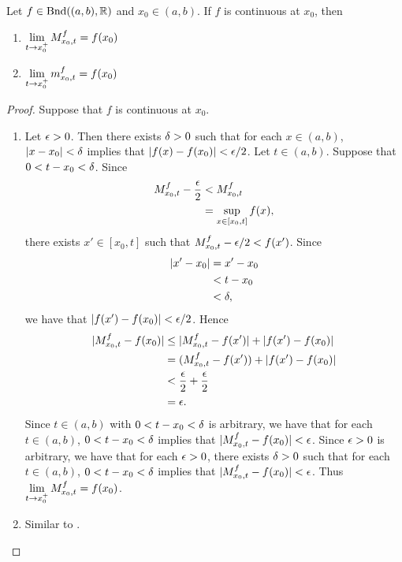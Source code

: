 \documentclass{book}
\begin{document}
	\begin{ex} 
		Let $f \in \text{Bnd}((a,b), \mathbb{R})$ and $x_0 \in (a,b)$. If $f$ is continuous at $x_0$, then 
		\begin{enumerate}
			\item $\lim \limits_{t \rightarrow x_0^+} M^f_{x_0, t} = f(x_0)$ 
			\item $\lim \limits_{t \rightarrow x_0^+} m^f_{x_0, t} = f(x_0)$
		\end{enumerate}
	\end{ex}
	
	\begin{proof} 
		Suppose that $f$ is continuous at $x_0$. 
		\begin{enumerate}
			\item Let $\epsilon > 0$. Then there exists $\delta > 0$ such that for each $x \in (a,b)$, $|x-x_0| < \delta$ implies that $|f(x) - f(x_0)| < \epsilon/2$. Let $t \in (a, b)$. Suppose that $0 < t - x_0 < \delta$. Since 
			\begin{align*}
				M^f_{x_0, t} - \frac{\epsilon}{2}
				& < M^f_{x_0, t} \\
				& = \sup\limits_{x \in [x_0, t]} f(x), 
			\end{align*}
			there exists $x' \in [x_0, t]$ such that $M^f_{x_0, t} - \epsilon/2 < f(x')$. Since 
			\begin{align*}
				|x' - x_0| 
				& = x' - x_0 \\
				& < t - x_0 \\
				& < \delta,
			\end{align*}
			we have that $|f(x') - f(x_0)| < \epsilon/2$. Hence
			\begin{align*}
				|M^f_{x_0, t} - f(x_0)|
				& \leq |M^f_{x_0, t} - f(x')| + |f(x') - f(x_0)| \\
				& = (M^f_{x_0, t} - f(x')) + |f(x') - f(x_0)| \\
				& < \frac{\epsilon}{2} + \frac{\epsilon}{2} \\
				& = \epsilon.
			\end{align*}
			Since $t \in (a,b)$ with $0 < t - x_0 < \delta$ is arbitrary, we have that for each $t \in (a,b)$, $0 < t - x_0 < \delta$ implies that $|M^f_{x_0, t} - f(x_0)| < \epsilon$. Since $\epsilon > 0$ is arbitrary, we have that for each $\epsilon > 0$, there exists $\delta > 0$ such that for each $t \in (a,b)$, $0 < t - x_0 < \delta$ implies that $|M^f_{x_0, t} - f(x_0)| < \epsilon$. Thus $\lim \limits_{t \rightarrow x_0^+} M^f_{x_0, t} = f(x_0)$.
			\item Similar to .
		\end{enumerate}
	\end{proof}
	
\end{document}
